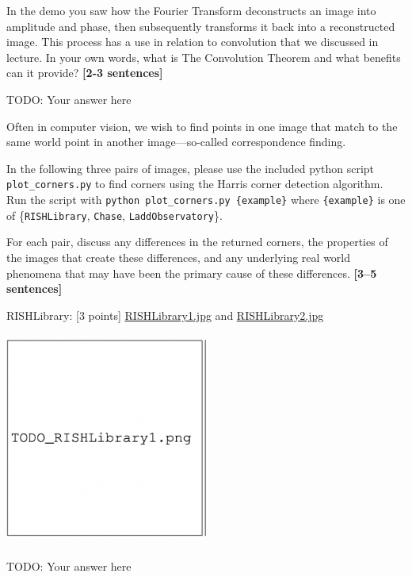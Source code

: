 \documentclass{csci1430}
\begin{document}
\newpage

\begin{subquestion}[points=2]
In the demo you saw how the Fourier Transform deconstructs an image into amplitude and phase, then subsequently transforms it back into a reconstructed image. This process has a use in relation to convolution that we discussed in lecture. In your own words, what is The Convolution Theorem and what benefits can it provide? \textbf{[2-3 sentences]}
\end{subquestion}

\begin{answer}[height=16]
TODO: Your answer here
\end{answer}


\pagebreak


Often in computer vision, we wish to find points in one image that match to the same world point in another image---so-called correspondence finding.

\begin{question}[points=9] 
In the following three pairs of images, please use the included python script \texttt{plot\_corners.py} to find corners using the Harris corner detection algorithm. Run the script with \texttt{python plot\_corners.py \{example\}} where \texttt{\{example\}} is one of \{\texttt{RISHLibrary}, \texttt{Chase}, \texttt{LaddObservatory}\}.

For each pair, discuss any differences in the returned corners, the properties of the images that create these differences, and any underlying real world phenomena that may have been the primary cause of these differences. \textbf{[3--5 sentences]}
\end{question}

RISHLibrary: [3 points]
\href{images/RISHLibrary1.jpg}{RISHLibrary1.jpg} and \href{images/RISHLibrary2.jpg}{RISHLibrary2.jpg} 

\begin{answer}[height=22]
\includegraphics[width=0.5\textwidth,height=7cm,keepaspectratio]{images/TODO_RishLibrary1.png}

TODO: Your answer here
\end{answer}
\end{document}
